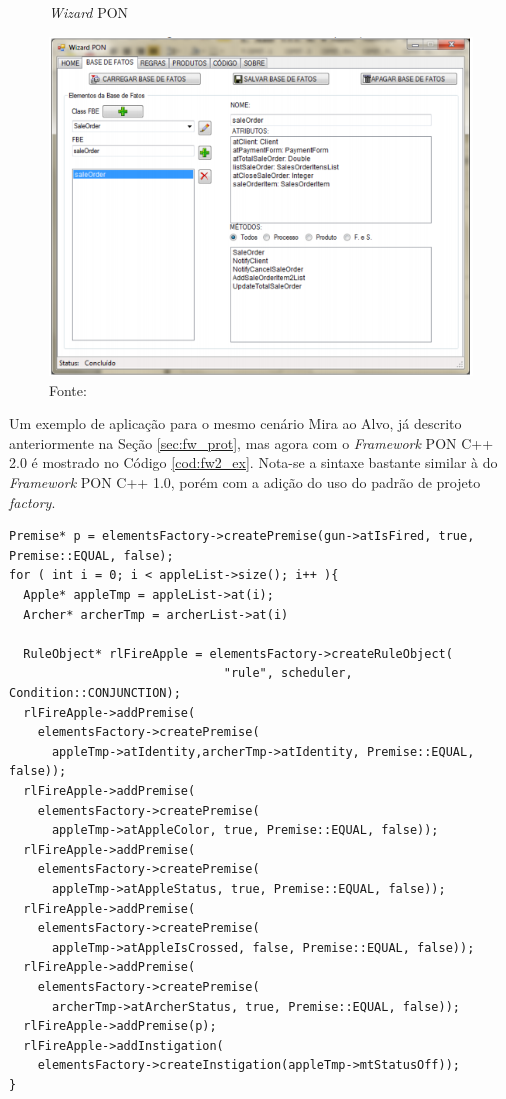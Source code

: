 \begin{figure}[!htb]
  \centering
  \caption{\textit{Wizard} PON} \includegraphics[width=.9\textwidth]{../figures/wizard.png}
  \caption*{Fonte: }
  \label{fig:wizard}
\end{figure}

Um exemplo de aplicação para o mesmo cenário Mira ao Alvo, já descrito
anteriormente na Seção \ref{sec:fw_prot}, mas agora com o \textit{Framework} PON
C++ 2.0 é mostrado no Código \ref{cod:fw2_ex}. Nota-se a sintaxe bastante
similar à do \textit{Framework} PON C++ 1.0, porém com a adição do uso do padrão
de projeto \textit{factory}. 

\begin{lstlisting}[caption = {Exemplo de programa com o \textit{framework} C++ 2.0},
source = {Adaptado de \citeonline{msc_valenca_2012}},
  label = {cod:fw2_ex}, float=htb]
Premise* p = elementsFactory->createPremise(gun->atIsFired, true, Premise::EQUAL, false);
for ( int i = 0; i < appleList->size(); i++ ){
  Apple* appleTmp = appleList->at(i);
  Archer* archerTmp = archerList->at(i)

  RuleObject* rlFireApple = elementsFactory->createRuleObject(
                              "rule", scheduler, Condition::CONJUNCTION);
  rlFireApple->addPremise(
    elementsFactory->createPremise(
      appleTmp->atIdentity,archerTmp->atIdentity, Premise::EQUAL, false));
  rlFireApple->addPremise(
    elementsFactory->createPremise(
      appleTmp->atAppleColor, true, Premise::EQUAL, false));
  rlFireApple->addPremise(
    elementsFactory->createPremise(
      appleTmp->atAppleStatus, true, Premise::EQUAL, false));
  rlFireApple->addPremise(
    elementsFactory->createPremise(
      appleTmp->atAppleIsCrossed, false, Premise::EQUAL, false));
  rlFireApple->addPremise(
    elementsFactory->createPremise(
      archerTmp->atArcherStatus, true, Premise::EQUAL, false));
  rlFireApple->addPremise(p);
  rlFireApple->addInstigation(
    elementsFactory->createInstigation(appleTmp->mtStatusOff));
}
\end{lstlisting}

